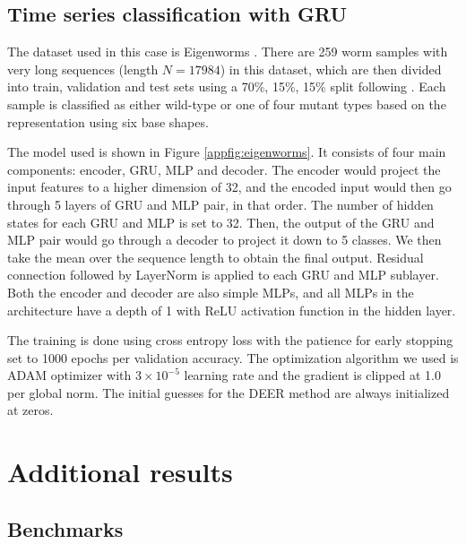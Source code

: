 \subsection{Time series classification with GRU}
\label{appsec:gru-training-details}

The dataset used in this case is Eigenworms \citep{brown2013dictionaryeigenworms}. There are 259 worm samples with very long sequences (length $N = 17984$) in this dataset, which are then divided into train, validation and test sets using a 70\%, 15\%, 15\% split following \cite{morrill2021neuralrough}. Each sample is classified as either wild-type or one of four mutant types based on the representation using six base shapes.

The model used is shown in Figure \ref{appfig:eigenworms}. It consists of four main components: encoder, GRU, MLP and decoder. The encoder would project the input features to a higher dimension of 32, and the encoded input would then go through 5 layers of GRU and MLP pair, in that order. The number of hidden states for each GRU and MLP is set to 32. Then, the output of the GRU and MLP pair would go through a decoder to project it down to 5 classes. We then take the mean over the sequence length to obtain the final output. Residual connection followed by LayerNorm is applied to each GRU and MLP sublayer. Both the encoder and decoder are also simple MLPs, and all MLPs in the architecture have a depth of 1 with ReLU activation function in the hidden layer.

The training is done using cross entropy loss with the patience for early stopping set to 1000 epochs per validation accuracy. The optimization algorithm we used is ADAM optimizer with $3\times 10^{-5}$ learning rate and the gradient is clipped at 1.0 per global norm. The initial guesses for the DEER method are always initialized at zeros.














\section{Additional results}

\subsection{Benchmarks}
\label{appsec:benchmarks}

